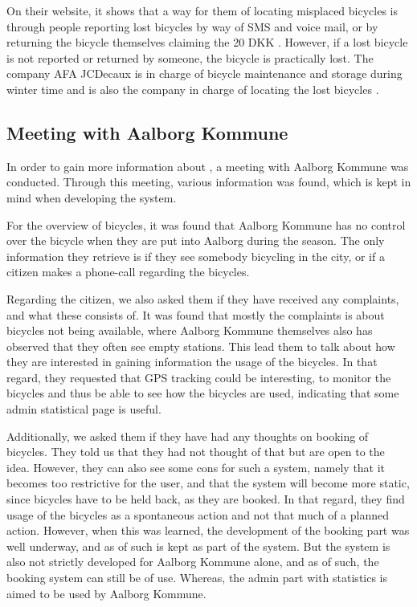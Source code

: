 On their website, it shows that a way for them of locating misplaced bicycles is through people reporting lost bicycles by way of SMS and voice mail, or by returning the bicycle themselves claiming the 20 DKK \citep{misc:aalborgbycykelmangler}.
However, if a lost bicycle is not reported or returned by someone, the bicycle is practically lost.
The company AFA JCDecaux is in charge of bicycle maintenance and storage during winter time and is also the company in charge of locating the lost bicycles \citep{misc:aalborgcykling}.

\subsection{Meeting with Aalborg Kommune}
In order to gain more information about \bycykelwithoutspace, a meeting with Aalborg Kommune was conducted. 
Through this meeting, various information was found, which is kept in mind when developing the system.

For the overview of bicycles, it was found that Aalborg Kommune has no control over the bicycle when they are put into Aalborg during the season.
The only information they retrieve is if they see somebody bicycling in the city, or if a citizen makes a phone-call regarding the bicycles.

Regarding the citizen, we also asked them if they have received any complaints, and what these consists of.
It was found that mostly the complaints is about bicycles not being available, where Aalborg Kommune themselves also has observed that they often see empty stations.
This lead them to talk about how they are interested in gaining information the usage of the bicycles.
In that regard, they requested that GPS tracking could be interesting, to monitor the bicycles and thus be able to see how the bicycles are used, indicating that some admin statistical page is useful.

Additionally, we asked them if they have had any thoughts on booking of bicycles.
They told us that they had not thought of that but are open to the idea.
However, they can also see some cons for such a system, namely that it becomes too restrictive for the user, and that the system will become more static, since bicycles have to be held back, as they are booked.
In that regard, they find usage of the bicycles as a spontaneous action and not that much of a planned action.
However, when this was learned, the development of the booking part was well underway, and as of such is kept as part of the system.
But the system is also not strictly developed for Aalborg Kommune alone, and as of such, the booking system can still be of use.
Whereas, the admin part with statistics is aimed to be used by Aalborg Kommune.

